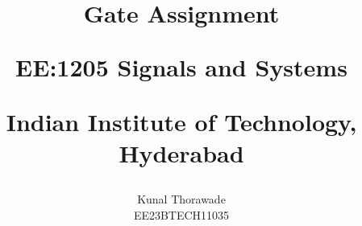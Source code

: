 \documentclass[journal,12pt,onecolumn]{IEEEtran}
\theoremstyle{remark}
\begin{document}
%




\vspace{3cm}

\title{
	Gate Assignment

	\large{EE:1205 Signals and Systems}

	Indian Institute of Technology, Hyderabad
}
\author{Kunal Thorawade

EE23BTECH11035
}	
\maketitle



\bigskip
 
 \renewcommand{\thefigure}{\theenumi}
 \renewcommand{\thetable}{\arabic{table}}
 \renewcommand{\thefigure}{\arabic{figure}}
\end{document}
